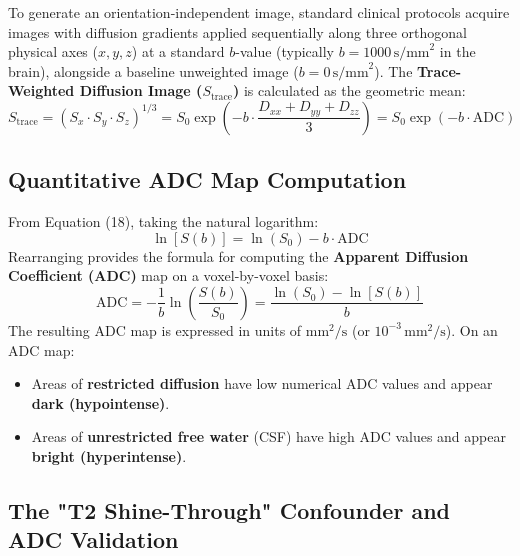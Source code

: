 \documentclass[11pt,a4paper]{article}
\begin{document}
To generate an orientation-independent image, standard clinical protocols acquire images with diffusion gradients applied sequentially along three orthogonal physical axes ($x, y, z$) at a standard $b$-value (typically $b = 1000\,\text{s/mm}^2$ in the brain), alongside a baseline unweighted image ($b = 0\,\text{s/mm}^2$). The \textbf{Trace-Weighted Diffusion Image ($S_{\text{trace}}$)} is calculated as the geometric mean:
\begin{equation}
    S_{\text{trace}} = \left( S_x \cdot S_y \cdot S_z \right)^{1/3} = S_0 \exp\left( -b \cdot \frac{D_{xx} + D_{yy} + D_{zz}}{3} \right) = S_0 \exp(-b \cdot \text{ADC})
\end{equation}

\subsection{Quantitative ADC Map Computation}

From Equation (18), taking the natural logarithm:
\begin{equation}
    \ln\left[ S(b) \right] = \ln(S_0) - b \cdot \text{ADC}
\end{equation}
Rearranging provides the formula for computing the \textbf{Apparent Diffusion Coefficient (ADC)} map on a voxel-by-voxel basis:
\begin{equation}
    \text{ADC} = -\frac{1}{b} \ln\left( \frac{S(b)}{S_0} \right) = \frac{\ln(S_0) - \ln\left[ S(b) \right]}{b}
\end{equation}
The resulting ADC map is expressed in units of $\text{mm}^2/\text{s}$ (or $10^{-3}\,\text{mm}^2/\text{s}$). On an ADC map:
\begin{itemize}[leftmargin=*]
    \item Areas of \textbf{restricted diffusion} have low numerical ADC values and appear \textbf{dark (hypointense)}.
    \item Areas of \textbf{unrestricted free water} (CSF) have high ADC values and appear \textbf{bright (hyperintense)}.
\end{itemize}

\subsection{The "T2 Shine-Through" Confounder and ADC Validation}
\end{document}

